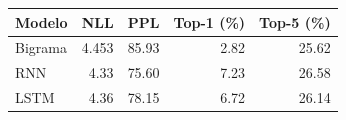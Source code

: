 \begin{tabular}{lrrrr}
\toprule
Modelo & NLL & PPL & Top-1 (\%) & Top-5 (\%) \\
\midrule
Bigrama & 4.453 & 85.93 & 2.82 & 25.62 \\
RNN & 4.33 & 75.60 & 7.23 & 26.58 \\
LSTM & 4.36 & 78.15 & 6.72 & 26.14 \\
\bottomrule
\end{tabular}